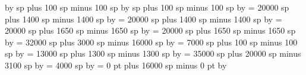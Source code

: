 {\multiply\punctuminclinatumdebilisshift by \grefactor %
%
 sp plus 100 sp minus 100 sp%
\multiply\punctuminclinatumbigshift by \grefactor%
%
 sp plus 100 sp minus 100 sp%
\multiply\punctuminclinatummaxshift by \grefactor%
%
\spacearoundsmallbar = 20000 sp plus 1400 sp minus 1400 sp%
\multiply\spacearoundsmallbar by \grefactor %
%
\spacearoundminor = 20000 sp plus 1400 sp minus 1400 sp%
\multiply\spacearoundminor by \grefactor %
%
\spacearoundmaior = 20000 sp plus 1650 sp minus 1650 sp%
\multiply\spacearoundmaior by \grefactor %
%
\spacearoundfinalis = 20000 sp plus 1650 sp minus 1650 sp%
\multiply\spacearoundfinalis by \grefactor %
%
\spacebeforefinalfinalis= 32000 sp plus 3000 sp minus 16000 sp%
\multiply\spacebeforefinalfinalis by \grefactor %
%
\spacearoundclefbars= 7000 sp plus 100 sp minus 100 sp%
\multiply\spacearoundclefbars by \grefactor %
%
\textbartextspace = 13000 sp plus 1300 sp minus 1300 sp%
\multiply\textbartextspace by \grefactor %
%
\notebarspace = 35000 sp plus 20000 sp minus 3100 sp%
\multiply\notebarspace by \grefactor %
%
\maximumspacewithoutdash = 4000 sp%
\multiply\maximumspacewithoutdash by \grefactor %
%
\afterclefnospace = 0 pt plus 16000 sp minus 0 pt%
\multiply\afterclefnospace by \grefactor %
\relax %
}
